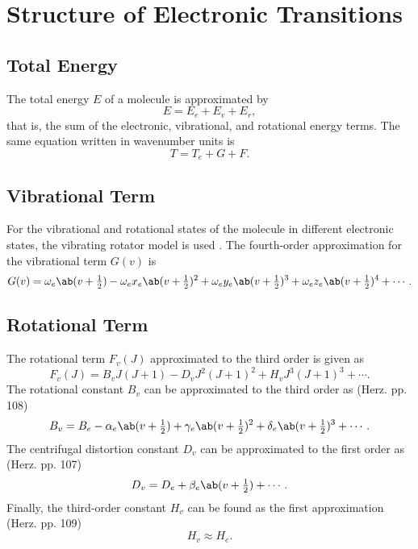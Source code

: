 \chapter{Structure of Electronic Transitions}
\label{c:structure_of_electronic_transitions}

\section{Total Energy}
\label{s:total_energy}

The total energy $E$ of a molecule is approximated by
\begin{equation*}
    E = E_e + E_v + E_r,
\end{equation*}
that is, the sum of the electronic, vibrational, and rotational energy terms. The same equation written in wavenumber units is
\begin{equation}
    T = T_e + G + F.
\end{equation}

\section{Vibrational Term}
\label{s:vibrational_term}

For the vibrational and rotational states of the molecule in different electronic states, the vibrating rotator model is used \cite{herzberg:diatomic}. The fourth-order approximation for the vibrational term $G(v)$ is
\begin{equation}
    G(v) = \omega_e\ab(v + \tfrac{1}{2}) - \omega_ex_e\ab(v + \tfrac{1}{2})^2 + \omega_ey_e\ab(v + \tfrac{1}{2})^3 + \omega_ez_e\ab(v + \tfrac{1}{2})^4 + \dotsb.
\end{equation}

\section{Rotational Term}
\label{s:rotational_term}

The rotational term $F_v(J)$ approximated to the third order is given as
\begin{equation}
    F_v(J) = B_vJ(J + 1) - D_vJ^2(J + 1)^2 + H_vJ^3(J + 1)^3 + \dotsb.
\end{equation}
The rotational constant $B_v$ can be approximated to the third order as (Herz. pp. 108)
\begin{equation*}
    B_v = B_e - \alpha_e\ab(v + \tfrac{1}{2}) + \gamma_e\ab(v + \tfrac{1}{2})^2 + \delta_e\ab(v + \tfrac{1}{2})^3 + \dotsb.
\end{equation*}
The centrifugal distortion constant $D_v$ can be approximated to the first order as (Herz. pp. 107)
\begin{equation}
    D_v = D_e + \beta_e\ab(v + \tfrac{1}{2}) + \dotsb.
\end{equation}
Finally, the third-order constant $H_v$ can be found as the first approximation (Herz. pp. 109)
\begin{equation}
    H_v \approx H_e.
\end{equation}

